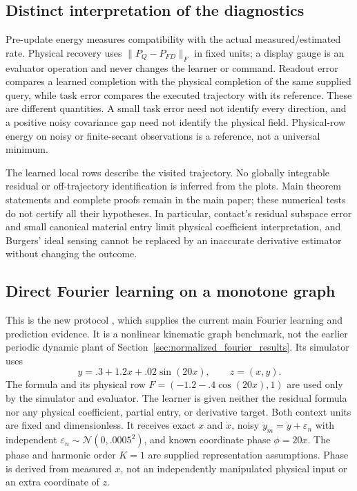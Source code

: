 \documentclass[journal]{IEEEtran}
\begin{document}
\subsection{Distinct interpretation of the diagnostics}
Pre-update energy measures compatibility with the actual measured/estimated
rate. Physical recovery uses $\|P_Q-P_{FD}\|_F$ in fixed units; a display gauge
is an evaluator operation and never changes the learner or command.
Readout error compares a learned completion with the physical completion of
the same supplied query, while task error compares the executed trajectory
with its reference. These are different quantities. A small task error need
not identify every direction, and a positive noisy covariance gap need not
identify the physical field. Physical-row energy on noisy or finite-secant
observations is a reference, not a universal minimum.

The learned local rows describe the visited trajectory. No globally
integrable residual or off-trajectory identification is inferred from the
plots. Main theorem statements and complete proofs remain in the main paper;
these numerical tests do not certify all their hypotheses. In particular,
contact's residual subspace error and small canonical material entry limit
physical coefficient interpretation, and Burgers' ideal sensing cannot be
replaced by an inaccurate derivative estimator without changing the outcome.

\subsection{Direct Fourier learning on a monotone graph}
\label{sec:direct_fourier_protocol}
This is the new protocol ,
which supplies the current main Fourier learning and prediction evidence.
It is a nonlinear kinematic graph benchmark, not the earlier periodic dynamic
plant of Section~\ref{sec:normalized_fourier_results}. Its simulator uses
\begin{equation}
 y=.3+1.2x+.02\sin(20x),\qquad z=(x,y).
 \label{eq:df_graph}
\end{equation}
The formula and its physical row $F=(-1.2-.4\cos(20x),1)$ are used only by
the simulator and evaluator. The learner is given neither the residual
formula nor any physical coefficient, partial entry, or derivative target.
Both context units are fixed and dimensionless. It receives exact $x$ and
$\dot x$, noisy $\dot y_m=\dot y+\varepsilon_n$ with independent
$\varepsilon_n\sim\mathcal N(0,.0005^2)$, and known coordinate phase
$\phi=20x$. The phase and harmonic order $K=1$ are supplied representation
assumptions. Phase is derived from measured $x$, not an independently
manipulated physical input or an extra coordinate of $z$.
\end{document}
